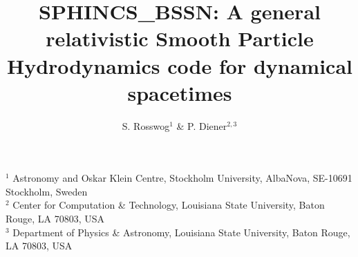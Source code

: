 \documentclass[useAMS,usenatbib]{iopart}
\begin{document}
\title[SPHINCS\_BSSN: SPH in dynamical spacetimes]{SPHINCS\_BSSN: A general relativistic Smooth Particle Hydrodynamics code for dynamical spacetimes}
\author[Rosswog \&Diener]{
 S. Rosswog$^1$  \& %
   P. Diener$^{2,3}$}%
$^1$ Astronomy and Oskar Klein Centre, Stockholm University, AlbaNova, SE-10691 Stockholm, Sweden\\
$^2$ Center for Computation \& Technology, Louisiana State University, Baton Rouge, LA 70803, USA\\
$^3$ Department of Physics \& Astronomy, Louisiana State University, Baton Rouge, LA 70803, USA


\def\ent{\mathcal{E}} 

\newcommand{\SpB}{\texttt{SPHINCS\_BSSN}\enskip}
\newcommand{\spB}{\texttt{SPHINCS\_BSSN}}
\newcommand{\Ma}{\texttt{MAGMA2}\enskip}
\newcommand{\ma}{\texttt{MAGMA2}}
\newcommand{\ahf}{\texttt{AHFinderDirect}}
\newcommand{\Ahf}{\texttt{AHFinderDirect}\enskip}
\newcommand{\mcl}{\texttt{McLachlan}}
\newcommand{\Mcl}{\texttt{McLachlan}\enskip}
\newcommand{\tlg}{\tilde{\gamma}}
\newcommand{\emfp}{e^{-4\phi}}
\newcommand{\emfpW}{W^2}
\newcommand{\tlG}{\tilde{\Gamma}}
\newcommand{\tlGn}{\tilde{\Gamma}_{\mathrm{(n)}}}
\newcommand{\tlGmixed}[2]{\tlG_{#1}^{\;\;\;#2}}
\newcommand{\tlA}{\tilde{A}}
\newcommand{\tlR}{\tilde{R}}
\newcommand{\xt}{\tilde{x}}
\newcommand{\dt}[1]{\partial_t #1}
\newcommand{\pdu}[3]{\partial_{#3} #1^{#2}}
\newcommand{\pdl}[3]{\partial_{#3} #1_{#2}}
\newcommand{\pdpdu}[4]{\partial_{#3}\partial_{#4} #1^{#2}}
\newcommand{\pdpdl}[4]{\partial_{#3}\partial_{#4} #1_{#2}}
\newcommand{\upwindu}[3]{\beta^{#3}\bar{\partial}_{#3} #1^{#2}}
\newcommand{\upwindl}[3]{\beta^{#3}\bar{\partial}_{#3} #1_{#2}}
\end{document}
